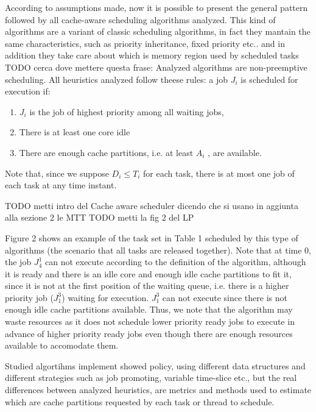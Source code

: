 \documentclass[a4paper,10pt]{article}
\begin{document}
\begin{multicols}{2}
According to assumptions made, now it is possible to present the general pattern followed by all cache-aware scheduling algorithms analyzed.
This kind of algorithms are a variant of classic scheduling algorithms, in fact they mantain the same characteristics, such as priority inheritance,
fixed priority etc.. and in addition they take care about which is memory region used by scheduled tasks
TODO cerca dove mettere questa frase:
Analyzed algorithms are non-preemptive scheduling.
All heuristics analyzed follow theese rules: a job $J_i$ is scheduled for execution if:

\begin{enumerate}
	\item $J_i$ is the job of highest priority among all waiting jobs,
	\item There is at least one core idle
	\item There are enough cache partitions, i.e. at least $A_i$ , are available.
\end{enumerate}

Note that, since we suppose $D_i \le T_i$ for each task, there is at most one job of each task at any time instant.

TODO metti intro del Cache aware scheduler dicendo che si usano in aggiunta alla sezione 2 le MTT
TODO metti la fig 2 del LP

Figure 2 shows an example of the task set in Table 1 scheduled by this type of algorithms (the scenario that all tasks are released
together). Note that at time 0, the job $J_{4}^1$ can not execute according to the definition of the algorithm, although it is ready and
there is an idle core and enough idle cache partitions to fit it, since it is not at the first position of the waiting queue,
i.e. there is a higher priority job ($J_{1}^3$) waiting for execution. $J_{1}^3$ can not execute since there is not enough idle cache
partitions available. Thus, we note that the algorithm may waste resources as it does not schedule lower priority ready jobs to execute in advance of 
higher priority ready jobs even though there are enough resources available to accomodate them.


Studied algortihms implement showed policy, using different data structures and different strategies such as job promoting, 
variable time-slice etc., but the real differences between analyzed heuristics, are metrics and methods used to estimate which are cache 
partitions requested by each task or thread to schedule.
 


\end{multicols}
\end{document}
